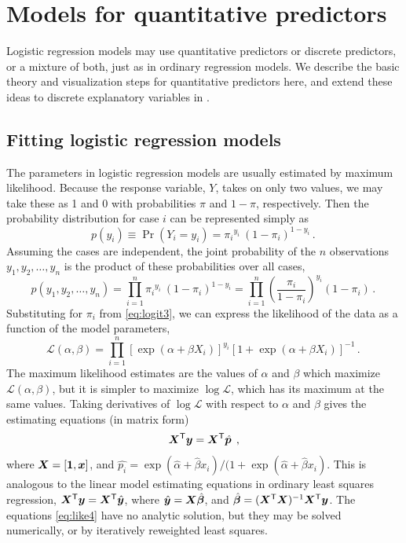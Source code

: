 \section{Models for quantitative predictors}\label{sec:logist-quant}
Logistic regression models may use quantitative predictors or discrete
predictors, or a mixture of both, just as in ordinary regression models.
We describe the basic theory and visualization steps for
quantitative predictors here, and extend these ideas to discrete
explanatory variables in .

\subsection{Fitting logistic regression models}
The parameters in logistic regression models are usually estimated
by maximum likelihood.
Because the response variable, $Y$, takes on only two values, we may
take these as 
1 and 0 with probabilities
$\pi$ and $1-\pi$, respectively.  Then
the probability distribution for case $i$ can be represented
simply as
\begin{equation*}
 p ( y_i ) \equiv \Pr (Y_i = y_i) = {\pi_i}^{y_i} \: (1 - \pi_i)^{1 - y_i}
 \period
\end{equation*}
Assuming the cases are independent, the joint probability of
the $n$ observations $y_1 , y_2 , \dots , y_n$ is the
product of these probabilities over all cases,
\begin{equation*}%
p ( y_1 , y_2 , \dots , y_n ) = \prod_{i=1}^n {\pi_i}^{y_i} \: (1 - \pi_i)^{1 - y_i}
 = \prod_{i=1}^n {\left( \frac{\pi_i}{1 - \pi_i} \right)}^{y_i} (1 - \pi_i)
 \period
\end{equation*}
Substituting for $\pi_i$ from \eqref{eq:logit3},
we can express the likelihood of the data
as a function of the model parameters,
\begin{equation}\label{eq:like3}
\mathcal{L}(\alpha, \beta) =
 \prod_{i=1}^n [ \exp( \alpha + \beta X_i ) ]^{y_i} [1 + \exp( \alpha + \beta X_i )]^{-1} \period
\end{equation}
The maximum likelihood estimates are the values of $\alpha$ and $\beta$
which maximize $ \mathcal{L}(\alpha, \beta)$,
but it is simpler to maximize $\log \mathcal{L}$,
which has its maximum at the same values.
Taking derivatives of $\log \mathcal{L}$
with respect to $\alpha$ and $\beta$
gives the estimating equations (in matrix form)
\begin{equation}\label{eq:like4}
\bm{X} ^\mathsf{T} \bm{y} = \bm{X} ^\mathsf{T} \hat{\bm{p}}
\:\: ,
\end{equation}
where $ \bm{X} = [ \bm{1}, \bm{x} ]$,
and
$\hat{p_i} = \exp (\hat{\alpha} + \hat{\beta} x_i) / (1+ \exp (\hat{\alpha} + \hat{\beta} x_i) $.
This is analogous to the linear model estimating equations in
ordinary least squares regression,
$\bm{X} ^\mathsf{T} \bm{y} = \bm{X} ^\mathsf{T} \hat{\bm{y}}$,
where $\hat{\bm{y}} = \bm{X} \hat{\bm{\beta}}$,
and $ \hat{\bm{\beta}} =  (\bm{X} ^\mathsf{T} \bm{X})^{-1}  \bm{X} ^\mathsf{T} \bm{y}$.
The equations \eqref{eq:like4} have no analytic solution, but they may be solved numerically, or by iteratively
reweighted least squares.

